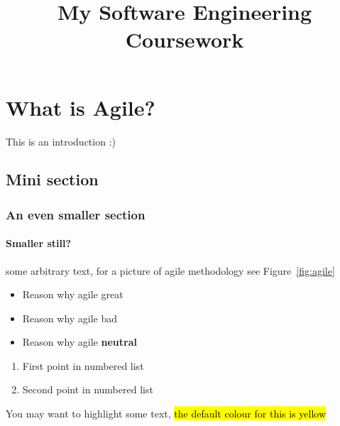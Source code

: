 \documentclass[11pt]{article}
\title{My Software Engineering Coursework}
\author{}
\begin{document}
\maketitle
\tableofcontents %
\listoffigures %
\section{What is Agile?}

This is an introduction  :) 
\subsection{Mini section}
\subsubsection{An even smaller section}
\paragraph{Smaller still?}
some arbitrary text, for a picture of agile methodology see Figure~\ref{fig:agile}

\begin{itemize}
\item Reason why agile great
\item Reason why agile bad
\item Reason why agile \textbf{neutral}
\end{itemize}

\begin{enumerate}
\item First point in numbered list
\item Second point in numbered list
\end{enumerate}

You may want to highlight some text, \hl{the default colour for this is yellow}
\end{document}
